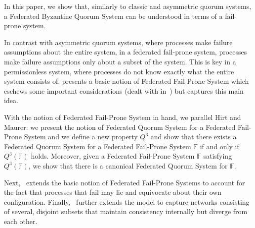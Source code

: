 \documentclass[11pt]{article}
\begin{document}
In this paper, we show that, similarly to classic and asymmetric quorum systems, a Federated Byzantine Quorum System can be understood in terms of a fail-prone system.

In contrast with asymmetric quorum systems, where processes make failure assumptions about the entire system, in a federated fail-prone system, processes make failure assumptions only about a subset of the system.
This is key in a permissionless system, where processes do not know exactly what the entire system consists of.
 presents a basic notion of Federated Fail-Prone System which eschews some important considerations (dealt with in~) but captures this main idea.


With the notion of Federated Fail-Prone System in hand, we parallel Hirt and Maurer: we present the notion of Federated Quorum System for a Federated Fail-Prone System and we define a new property $Q^3$ and show that there exists a Federated Quorum System for a Federated Fail-Prone System $\mathbb{F}$ if and only if $Q^3(\mathbb{F})$ holds. Moreover, given a Federated Fail-Prone System $\mathbb{F}$ satisfying $Q^3(\mathbb{F})$, we show that there is a canonical Federated Quorum System for $\mathbb{F}$.

Next,~ extends the basic notion of Federated Fail-Prone Systems to account for the fact that processes that fail may lie and equivocate about their own configuration. Finally,~ further extends the model to capture networks consisting of several, disjoint subsets that maintain consistency internally but diverge from each other.


\end{document}
